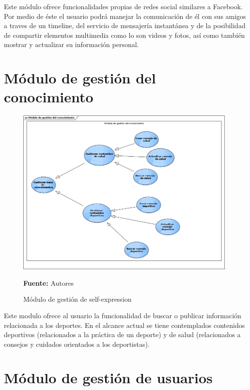 Este módulo ofrece funcionalidades propias de redes social similares a Facebook. Por medio de éste el usuario podrá manejar la comunicación de él con sus amigos a traves de un timeline, del servicio de mensajería instantánea y de la posibilidad de compartir elementos multimedia como lo son videos y fotos, así como también mostrar y actualizar su información personal.

\section{Módulo de gestión del conocimiento}

\begin{figure}[!htb]
  \begin{center}
    \includegraphics[width=11cm]{./imagenes/casos_uso/gestion_conocimiento.png}
    \caption{Módulo de gestión de self-expression}
    \label{fig:cu_self_shar}
    \textbf{Fuente:} Autores
  \end{center}
\end{figure}

Este modulo ofrece al usuario la funcionalidad de buscar o publicar información relacionada a los deportes. En el alcance actual se tiene contemplados contenidos deportivos (relacionados a la práctica de un deporte) y de salud (relacionados a consejos y cuidados orientados a los deportistas).

\section{Módulo de gestión de usuarios}

